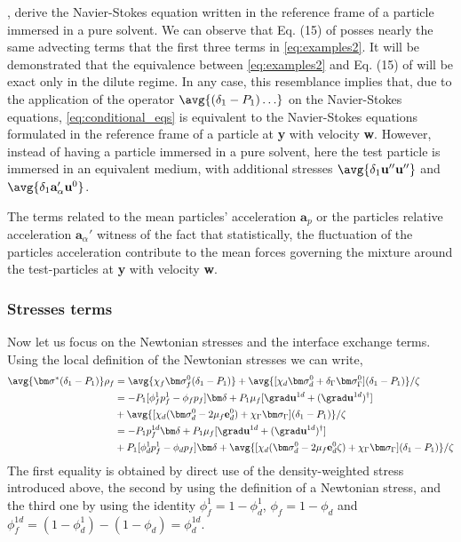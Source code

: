 \citet{maxey1983equation}, derive the Navier-Stokes equation written in the reference frame of a particle immersed in a pure solvent. 
We can observe that Eq. (15) of \citet{maxey1983equation} posses nearly the same advecting terms that the first three terms in \ref{eq:examples2}. 
It will be demonstrated that the equivalence between \ref{eq:examples2} and Eq. (15) of \citet{maxey1983equation} will be exact only in the dilute regime. 
In any case, this resemblance implies that, due to the application of the operator $\avg{(\delta_1-P_1)\ldots}$ on the Navier-Stokes equations, \ref{eq:conditional_eqs} is equivalent to the Navier-Stokes equations formulated in the reference frame of a particle at \textbf{y} with velocity \textbf{w}.
However, instead of having a particle immersed in a pure solvent, here the test particle is immersed in an equivalent medium, with additional stresses $\avg{\delta_1 \textbf{u}''\textbf{u}''}$ and $\avg{\delta_1\textbf{a}_\alpha' \textbf{u}^0}$. 


The terms related to the mean particles' acceleration $\textbf{a}_p$ or the particles relative acceleration $\textbf{a}_\alpha'$ witness of the fact that statistically, the fluctuation of the particles acceleration contribute to the mean forces governing the mixture around the test-particles at \textbf{y} with velocity \textbf{w}. 

\subsubsection{Stresses terms}

Now let us focus on the Newtonian stresses and the interface exchange terms. 
Using the local definition of the Newtonian stresses we can write, 
\begin{align}
    \avg{\bm\sigma^* (\delta_1 - P_1)} \rho_f
    &= \avg{\chi_f \bm\sigma^0_f (\delta_1 - P_1)}
    + \avg{[\chi_d \bm\sigma^0_d  + \delta_\Gamma \bm\sigma^0_\Gamma] (\delta_1 - P_1)}/\zeta
    \nonumber \\
    &= 
    - P_1 [
        \phi_f^1 p_f^1
        - \phi_f p_f
    ]\bm\delta
    + P_1 \mu_f [\grad \textbf{u}^{1d}+(\grad \textbf{u}^{1d})^\dagger] \nonumber \\
    &+ \avg{[\chi_d (\bm\sigma_d^0 - 2 \mu_f \textbf{e}^0_d ) + \chi_\Gamma \bm\sigma_\Gamma ]  (\delta_1 - P_1)}/\zeta \nonumber \\
    &= 
    - P_1  p_f^{1d}\bm\delta
    \label{eq:equivalent_stress}
    + P_1 \mu_f [\grad \textbf{u}^{1d}+(\grad \textbf{u}^{1d})^\dagger] \\
    &+P_1 [\phi_d^1 p_f^1
    - \phi_d p_f]\bm\delta
    + \avg{[\chi_d (\bm\sigma_d^0 - 2 \mu_f \textbf{e}^0_d \zeta) + \chi_\Gamma \bm\sigma_\Gamma ]  (\delta_1 - P_1)} /\zeta \nonumber
\end{align}
The first equality is obtained by direct use of the density-weighted stress introduced above, the second by using the definition of a Newtonian stress, and the third one by using the identity $\phi_f^1 =1  - \phi_d^1$, $\phi_f = 1 -\phi_d$ and $\phi_f^{1d} = (1 - \phi_d^1) - (1 - \phi_d) = \phi_d^{1d}$. 

